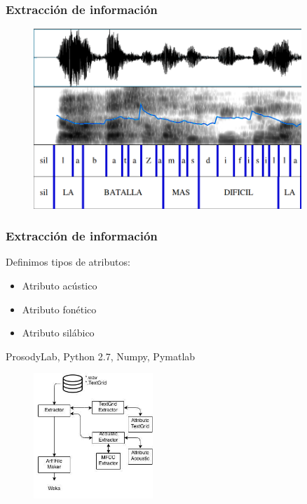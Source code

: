 \documentclass[mathserif]{beamer}%
\begin{document}
\begin{frame}
	\frametitle{Extracción de información}
	
	\begin{figure}[h!]
		\centerline{\includegraphics[width=0.9\textwidth]{espectograma_u3_t33_a1} }
	\end{figure}
\end{frame}

\begin{frame}
	\frametitle{Extracción de información}
	
	Definimos tipos de atributos:
	\begin{itemize}
		\item Atributo acústico
		\item Atributo fonético
		\item Atributo silábico
	\end{itemize}
	{\tiny ProsodyLab, Python 2.7, Numpy, Pymatlab}
	
	\begin{figure}[h!]
		\centerline{\includegraphics[width=0.4\textwidth]{diagrama_workflow} }
	\end{figure}
\end{frame}
\end{document}
